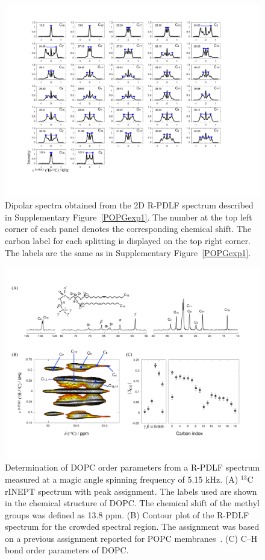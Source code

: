 \documentclass[fleqn,10pt]{wlscirepSI}
\begin{document}
\begin{figure}[p]
  \includegraphics[width=\textwidth]{Figures/POPG_slices.pdf}
  \caption{Dipolar spectra obtained from the 2D R-PDLF spectrum described in Supplementary Figure~\ref{POPGexp1}. The number at the top left corner of each panel denotes the corresponding chemical shift. The carbon label for each splitting is displayed on the top right corner. The labels are the same as in Supplementary Figure~\ref{POPGexp1}. }
  \label{POPGexp2}
\end{figure}

\begin{figure}
    \centering
    \includegraphics[width=\textwidth]{Figures/DOPCfig.pdf}
    \caption{Determination of DOPC order parameters from a R-PDLF spectrum measured at a magic angle spinning frequency of 5.15 kHz. (A) $^{13}$C rINEPT spectrum with peak assignment. The labels used are shown in the chemical structure of DOPC. The chemical shift of the methyl groups was defined as 13.8 ppm. (B) Contour plot of the R-PDLF spectrum for the crowded spectral region. The assignment was based on a previous assignment reported for POPC membranes~\cite{ferreira13}. (C) C--H bond order parameters of DOPC.}
    \label{fig:DOPCexp}
\end{figure}
\end{document}
